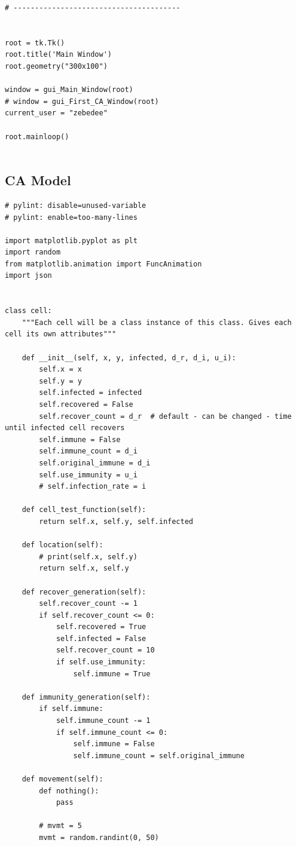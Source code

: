\documentclass[11pt, a4paper]{article}
\begin{document}
\begin{lstlisting}
# ---------------------------------------


root = tk.Tk()
root.title('Main Window')
root.geometry("300x100")

window = gui_Main_Window(root)
# window = gui_First_CA_Window(root)
current_user = "zebedee"

root.mainloop()
    
\end{lstlisting}

\subsection{CA Model}
\begin{lstlisting}
# pylint: disable=unused-variable
# pylint: enable=too-many-lines

import matplotlib.pyplot as plt
import random
from matplotlib.animation import FuncAnimation
import json


class cell:
    """Each cell will be a class instance of this class. Gives each cell its own attributes"""

    def __init__(self, x, y, infected, d_r, d_i, u_i):
        self.x = x
        self.y = y
        self.infected = infected
        self.recovered = False
        self.recover_count = d_r  # default - can be changed - time until infected cell recovers
        self.immune = False
        self.immune_count = d_i
        self.original_immune = d_i
        self.use_immunity = u_i
        # self.infection_rate = i

    def cell_test_function(self):
        return self.x, self.y, self.infected

    def location(self):
        # print(self.x, self.y)
        return self.x, self.y

    def recover_generation(self):
        self.recover_count -= 1
        if self.recover_count <= 0:
            self.recovered = True
            self.infected = False
            self.recover_count = 10
            if self.use_immunity:
                self.immune = True

    def immunity_generation(self):
        if self.immune:
            self.immune_count -= 1
            if self.immune_count <= 0:
                self.immune = False
                self.immune_count = self.original_immune

    def movement(self):
        def nothing():
            pass

        # mvmt = 5
        mvmt = random.randint(0, 50)


\end{lstlisting}
\end{document}
